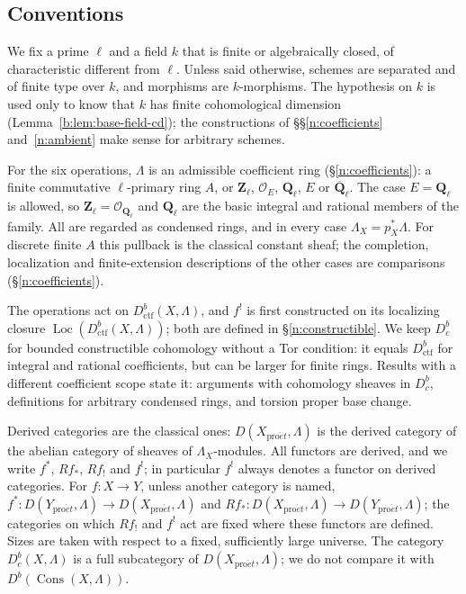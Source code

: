 \documentclass[11pt,a4paper]{article}
\numberwithin{equation}{section}
\theoremstyle{definition}
\theoremstyle{remark}
\newcommand{\Dbc}{D^b_c}
\newcommand{\Loc}{\operatorname{Loc}}
\newcommand{\Qbar}{\overline{\mathbf Q}_\ell}
\newcommand{\Ql}{\mathbf Q_\ell}
\newcommand{\Zl}{\mathbf Z_\ell}
\newcommand{\proet}{\mathrm{pro}\acute{e}t}
\newcommand{\Cons}{\operatorname{Cons}}
\newcommand{\Dctf}{D^b_{\mathrm{ctf}}}
\begin{document}
\subsection{Conventions}
We fix a prime $\ell$ and a field $k$ that is finite or algebraically
closed, of characteristic different from $\ell$. Unless said otherwise,
schemes are separated and of finite type over $k$, and morphisms are
$k$-morphisms. The hypothesis on $k$ is used only to know that $k$ has
finite cohomological dimension (Lemma~\ref{b:lem:base-field-cd}); the
constructions of \S\S\ref{n:coefficients} and~\ref{n:ambient} make sense
for arbitrary schemes.

For the six operations, $\Lambda$ is an admissible
coefficient ring (\S\ref{n:coefficients}): a finite commutative $\ell$-primary ring $A$, or
$\Zl$, $\mathcal O_E$, $\Ql$, $E$ or $\Qbar$. The case $E=\Ql$ is
allowed, so $\Zl=\mathcal O_{\Ql}$ and $\Ql$ are the basic integral and
rational members of the family. All are regarded as condensed rings,
and in every case $\Lambda_X=p_X^*\Lambda$. For discrete finite $A$
this pullback is the classical constant sheaf; the completion,
localization and finite-extension descriptions of the other cases are
comparisons (\S\ref{n:coefficients}).

The operations act on $\Dctf(X,\Lambda)$, and $f^!$ is first
constructed on its localizing closure $\Loc(\Dctf(X,\Lambda))$; both are
defined in \S\ref{n:constructible}. We keep $\Dbc$ for bounded
constructible cohomology without a Tor condition: it equals $\Dctf$
for integral and rational coefficients, but can be larger for finite
rings. Results with a different coefficient scope state it: arguments
with cohomology sheaves in $\Dbc$, definitions for arbitrary condensed
rings, and torsion proper base change.

Derived categories are the classical ones: $D(X_{\proet},\Lambda)$ is
the derived category of the abelian category of sheaves of
$\Lambda_X$-modules. All functors are derived, and we write $f^*$,
$Rf_*$, $Rf_!$ and $f^!$; in particular $f^!$ always denotes a functor
on derived categories. For $f\colon X\to Y$, unless another category is
named, $f^*\colon D(Y_{\proet},\Lambda)\to D(X_{\proet},\Lambda)$ and
$Rf_*\colon D(X_{\proet},\Lambda)\to D(Y_{\proet},\Lambda)$; the
categories on which $Rf_!$ and $f^!$ act are fixed where these functors
are defined. Sizes are taken with respect to a fixed,
sufficiently large universe. The category $\Dbc(X,\Lambda)$ is a full
subcategory of $D(X_{\proet},\Lambda)$; we do not compare it with
$D^b(\Cons(X,\Lambda))$.
\end{document}
